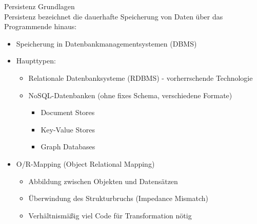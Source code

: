 \begin{concept}{Persistenz Grundlagen}\\
Persistenz bezeichnet die dauerhafte Speicherung von Daten über das Programmende hinaus:
\begin{itemize}
    \item Speicherung in Datenbankmanagementsystemen (DBMS)
    \item Haupttypen:
    \begin{itemize}
        \item Relationale Datenbanksysteme (RDBMS) - vorherrschende Technologie
        \item NoSQL-Datenbanken (ohne fixes Schema, verschiedene Formate)
        \begin{itemize}
            \item Document Stores
            \item Key-Value Stores
            \item Graph Databases
        \end{itemize}
    \end{itemize}
    \item O/R-Mapping (Object Relational Mapping)
    \begin{itemize}
        \item Abbildung zwischen Objekten und Datensätzen
        \item Überwindung des Strukturbruchs (Impedance Mismatch)
        \item Verhältnismäßig viel Code für Transformation nötig
    \end{itemize}
\end{itemize}
\end{concept}

